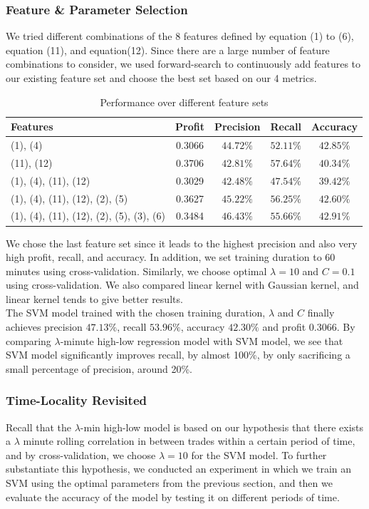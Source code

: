 \documentclass[10pt,twocolumn,letterpaper]{article}
\begin{document}
\subsubsection{Feature \& Parameter Selection}
We tried different combinations of the 8 features defined by equation (1) to (6), equation (11), and equation(12). Since there are a large number of feature combinations to consider, we used forward-search to continuously add features to our existing feature set and choose the best set based on our 4 metrics.
\begin{table}[H]
\centering
\caption{Performance over different feature sets}
\begin{tabular}{ p{2cm}|c|c|c|c }
 Features  & Profit & Precision & Recall & Accuracy \\
\hline
\hline
(1), (4) & 0.3066   &     $44.72\%$  &    $52.11\%$   & $42.85\%$  \\
\hline
(11), (12) &    0.3706     &   $42.81\%$   & $57.64\%$   &  $40.34\%$ \\
\hline
(1), (4), (11), (12) &    0.3029     &   $42.48\%$   & $47.54\%$   &  $39.42\%$ \\
\hline
(1), (4), (11), (12), (2), (5) &    0.3627     &   $45.22\%$   & $56.25\%$   &  $42.60\%$ \\
\hline
(1), (4), (11), (12), (2), (5), (3), (6) &    0.3484     &   $46.43\%$   & $55.66\%$   &  $42.91\%$ \\
\hline
\end{tabular}
\end{table}
We chose the last feature set since it leads to the highest precision and also very high profit, recall, and accuracy. In addition, we set training duration to 60 minutes using cross-validation. Similarly, we choose optimal $\lambda=10$ and $C=0.1$ using cross-validation. We also compared linear kernel with Gaussian kernel, and linear kernel tends to give better results.\\

The SVM model trained with the chosen training duration, $\lambda$ and $C$ finally achieves precision $47.13\%$, recall $53.96\%$, accuracy $42.30\%$ and profit $0.3066$. By comparing $\lambda$-minute high-low regression model with SVM model, we see that SVM model significantly improves recall, by almost 100\%, by only sacrificing a small percentage of precision, around 20\%.

\subsubsection{Time-Locality Revisited}
Recall that the $\lambda$-min high-low model is based on our hypothesis that there exists a $\lambda$ minute rolling correlation in between trades within a certain period of time, and by cross-validation, we choose $\lambda=10$ for the SVM model. To further substantiate this hypothesis, we conducted an experiment in which we train an SVM using the optimal parameters from the previous section, and then we evaluate the accuracy of the model by testing it on different periods of time.\\
\end{document}
